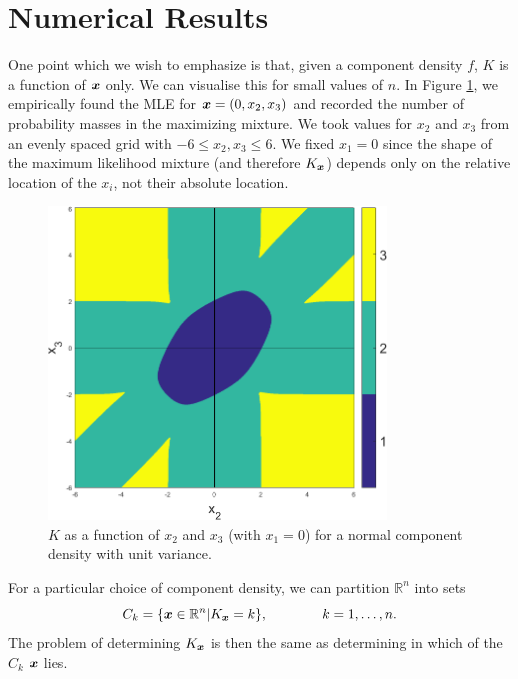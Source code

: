 
\section{Numerical Results}
		One point which we wish to emphasize is that, given a component density $f$, $K$ is a function of ${\bm{{x}}}$ only. We can visualise this for small values of $n$. In Figure \ref{fig:n3phase}, we empirically found the MLE for ${\bm{{x}}} = (0,x_2,x_3)$ and recorded the number of probability masses in the maximizing mixture. We took values for $x_2$ and $x_3$ from an evenly spaced grid with $-6\leq x_2,x_3\leq 6$. We fixed $x_1 = 0$ since the shape of the maximum likelihood mixture (and therefore $K_{{\bm{{x}}}}$) depends only on the relative location of the $x_i$, not their absolute location.
		
		\begin{figure}[ht]
			\centering
			\includegraphics[width=0.8\textwidth]{Sigma1n3res1024width6}
			\caption{$K$ as a function of $x_2$ and $x_3$ (with $x_1 = 0$) for a normal component density with unit variance.}\label{fig:n3phase}
		\end{figure}
		
		For a particular choice of component density, we can partition $\mathbb{R}^n$ into sets 
		\begin{equation}
			C_k = \{ {\bm{{x}}} \in \mathbb{R}^n | K_{{\bm{{x}}}} = k \}, \hspace{40pt} k = 1,\dots,n.
		\end{equation}
		The problem of determining $K_{{\bm{{x}}}}$ is then the same as determining in which of the $C_k$ ${\bm{{x}}}$ lies.

